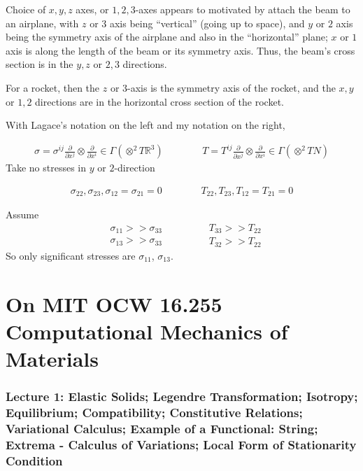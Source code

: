 \documentclass[twoside,landscape,10pt]{amsart}
\theoremstyle{plain}
\theoremstyle{definition}
\theoremstyle{remark}
\begin{document}
\begin{multicols*}{2}
Choice of $x,y,z$ axes, or $1,2,3$-axes appears to motivated by attach the beam to an airplane, with $z$ or $3$ axis being ``vertical'' (going up to space), and $y$ or $2$ axis being the symmetry axis of the airplane and also in the ``horizontal'' plane; $x$ or $1$ axis is along the length of the beam or its symmetry axis.  Thus, the beam's cross section is in the $y,z$ or $2,3$ directions.

For a rocket, then the $z$ or $3$-axis is the symmetry axis of the rocket, and the $x,y$ or $1,2$ directions are in the horizontal cross section of the rocket.  

With Lagace's notation on the left and my notation on the right,

\[
\begin{gathered}
\sigma = \sigma^{ij} \frac{ \partial }{ \partial x^j} \otimes \frac{ \partial }{ \partial x^i} \in \Gamma(\otimes^2T\mathbb{R}^3) \end{gathered} \quad \quad \quad \, 
\begin{gathered}
  T = T^{ij} \frac{ \partial }{ \partial x^j} \otimes \frac{ \partial }{ \partial x^i} \in \Gamma(\otimes^2 TN)
\end{gathered}
\] 
Take no stresses in $y$ or $2$-direction

\[
\begin{gathered}
  \sigma_{22}, \sigma_{23}, \sigma_{12} = \sigma_{21} = 0 
\end{gathered} \quad \quad \quad \, 
\begin{gathered}
T_{22}, T_{23}, T_{12}=T_{21} = 0 
\end{gathered}
\]

Assume
\[
\begin{aligned}
  & \sigma_{11} >> \sigma_{33} \\ 
  & \sigma_{13} >> \sigma_{33}
\end{aligned} \quad \quad \quad \, 
\begin{aligned}
  & T_{33} >> T_{22} \\ 
  & T_{32} >> T_{22}
\end{aligned}
\]
So only significant stresses are $\sigma_{11}$, $\sigma_{13}$.  



\part{On MIT OCW 16.255 Computational Mechanics of Materials}

\section{Lecture 1: Elastic Solids; Legendre Transformation; Isotropy; Equilibrium; Compatibility; Constitutive Relations; Variational Calculus; Example of a Functional: String; Extrema - Calculus of Variations; Local Form of Stationarity Condition}


\end{multicols*}
\end{document}

